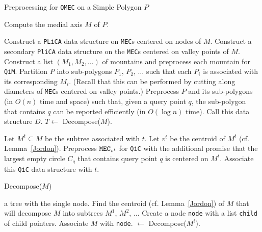 \documentclass[12pt]{llncs}
\begin{document}
\begin{algorithm}[h!]
\caption{Preprocessing for {\tt QMEC} on a Simple Polygon $P$}
\label{alg:qmecSP}
\begin{algorithmic}[1]
\STATE Compute the medial axis $M$ of $P$.

\STATE Construct a {\tt PLiCA} data structure on {\tt MEC}s centered on nodes of $M
$.
\STATE Construct a secondary {\tt PliCA} data structure on the {\tt MEC}s centered on 
valley points of $M$.
\STATE Construct a list $(M_1, M_2, \ldots )$ of mountains and preprocess each 
mountain for {\tt QiM}.
\STATE Partition $P$ into sub-polygons $P_1$, $P_2$, $\ldots$ such that each $P_i$ 
is associated with its corresponding $M_i$. (Recall that this can be performed by 
cutting along diameters of {\tt MEC}s centered on valley points.) 
\STATE Preprocess  $P$ and its sub-polygons (in $O(n)$ time and 
space) such that, given a query point $q$, the sub-polygon that contains $q$ can be 
reported efficiently (in $O(\log n)$ time). Call this data structure $D$. \label{lno:easy}
\STATE $T \leftarrow$ Decompose($M$). \label{lno:decompose}

 \label{lno:for}
\STATE Let $M^t \subseteq M$ be the subtree associated with $t$.
\STATE Let $v^t$ be the centroid of $M^t$ (cf. Lemma\ \ref{Jordon}).
\STATE Preprocess ${\tt MEC}_{v^t}$ for {\tt QiC} with the additional promise that 
the largest empty circle $C_q$ that contains query point $q$ is centered on 
$M^t$. Associate this {\tt QiC} data structure with $t$. \label{lno:qic}
\ENDFOR \label{lno:endfor}

\end{algorithmic}
\end{algorithm}

\begin{algorithm}[h!]
\caption{Decompose($M$)}
\label{alg:decompose}
\begin{algorithmic}[1]
\RETURN a tree with the single node.
\ENDIF
\STATE Find the centroid (cf. Lemma\ \ref{Jordon}) of $M$ that will decompose $M$ 
into subtrees $M^1$, $M^2$, $\ldots$
\STATE Create a  node {\tt node} with a list {\tt child} of child pointers.
\STATE Associate $M$ with {\tt node}.
 $\leftarrow$ Decompose($M^i$).
\ENDFOR
\end{algorithmic}
\end{algorithm}
\end{document}
